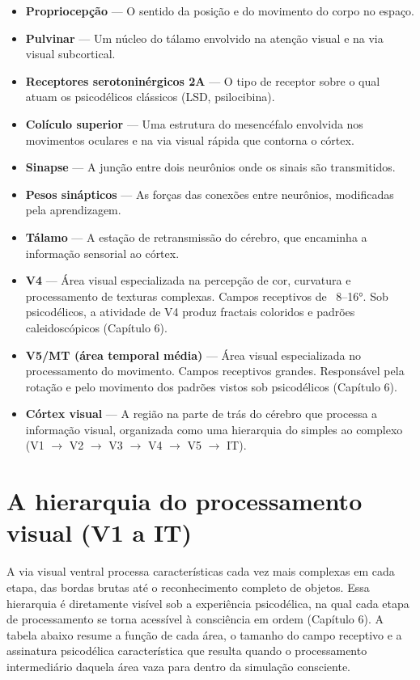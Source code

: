 \documentclass[11pt, twoside, openright]{book}
\begin{document}
\begin{itemize}
  \item \textbf{Propriocepção} --- O sentido da posição e do movimento do corpo no espaço.
  \item \textbf{Pulvinar} --- Um núcleo do tálamo envolvido na atenção visual e na via visual subcortical.
  \item \textbf{Receptores serotoninérgicos 2A} --- O tipo de receptor sobre o qual atuam os psicodélicos clássicos (LSD, psilocibina).
  \item \textbf{Colículo superior} --- Uma estrutura do mesencéfalo envolvida nos movimentos oculares e na via visual rápida que contorna o córtex.
  \item \textbf{Sinapse} --- A junção entre dois neurônios onde os sinais são transmitidos.
  \item \textbf{Pesos sinápticos} --- As forças das conexões entre neurônios, modificadas pela aprendizagem.
  \item \textbf{Tálamo} --- A estação de retransmissão do cérebro, que encaminha a informação sensorial ao córtex.
  \item \textbf{V4} --- Área visual especializada na percepção de cor, curvatura e processamento de texturas complexas. Campos receptivos de ~8--16°. Sob psicodélicos, a atividade de V4 produz fractais coloridos e padrões caleidoscópicos (Capítulo 6).
  \item \textbf{V5/\allowbreak{}MT (área temporal média)} --- Área visual especializada no processamento do movimento. Campos receptivos grandes. Responsável pela rotação e pelo movimento dos padrões vistos sob psicodélicos (Capítulo 6).
  \item \textbf{Córtex visual} --- A região na parte de trás do cérebro que processa a informação visual, organizada como uma hierarquia do simples ao complexo (V1 $\rightarrow$ V2 $\rightarrow$ V3 $\rightarrow$ V4 $\rightarrow$ V5 $\rightarrow$ IT).
\end{itemize}

\section*{A hierarquia do processamento visual (V1 a IT)}

A via visual ventral processa características cada vez mais complexas em cada etapa, das bordas brutas até o reconhecimento completo de objetos. Essa hierarquia é diretamente visível sob a experiência psicodélica, na qual cada etapa de processamento se torna acessível à consciência em ordem (Capítulo 6). A tabela abaixo resume a função de cada área, o tamanho do campo receptivo e a assinatura psicodélica característica que resulta quando o processamento intermediário daquela área vaza para dentro da simulação consciente.
\end{document}
